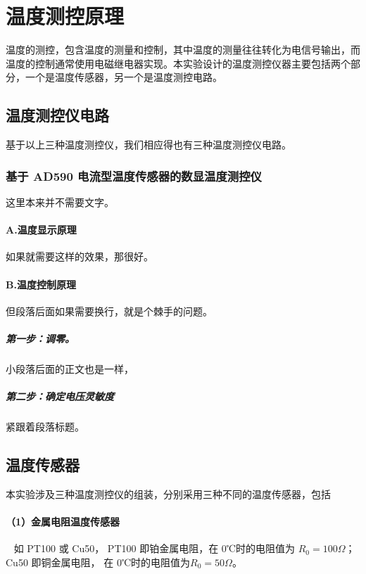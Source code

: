 \documentclass[10pt,a4paper,twocolumn,twoside,UTF8]{ctexart}
\begin{document}
\section{温度测控原理}
温度的测控，包含温度的测量和控制，其中温度的测量往往转化为电信号输出，而温度的控制通常使用电磁继电器实现。本实验设计的温度测控仪器主要包括两个部分，一个是温度传感器，另一个是温度测控电路。

	\subsection{温度测控仪电路}
	基于以上三种温度测控仪，我们相应得也有三种温度测控仪电路。
	\subsubsection{基于 AD590 电流型温度传感器的数显温度测控仪}
	这里本来并不需要文字。
	\paragraph{A.温度显示原理}
	如果就需要这样的效果，那很好。
	\paragraph{B.温度控制原理}但段落后面如果需要换行，就是个棘手的问题。
	\subparagraph{第一步：调零。}小段落后面的正文也是一样，
	\subparagraph{第二步：确定电压灵敏度}
	紧跟着段落标题。


	\subsection{温度传感器}
	本实验涉及三种温度测控仪的组装，分别采用三种不同的温度传感器，包括
	\paragraph{（1）金属电阻温度传感器}~
	\newline %
	\indent 如 PT100 或 Cu50， PT100 即铂金属电阻，在 0℃时的电阻值为 $R_0=100\Omega$； Cu50 即铜金属电阻， 在 0℃时的电阻值为$R_0=50\Omega$。
\end{document}
